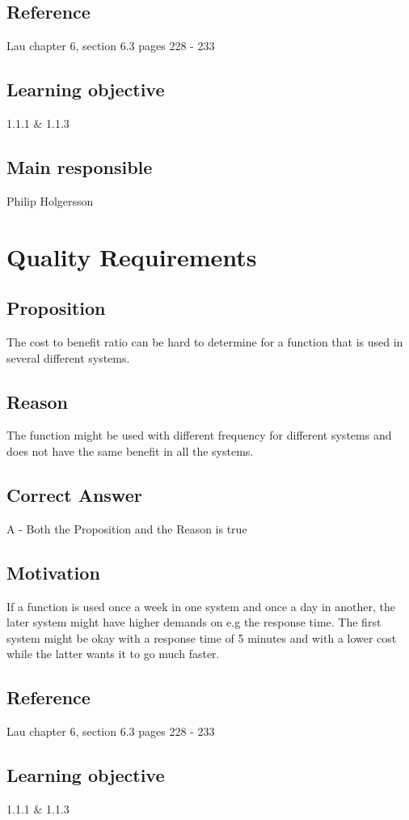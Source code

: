 \documentclass[a4paper]{article}
\begin{document}
\subsection*{Reference}
Lau chapter 6, section 6.3 pages 228 - 233
\subsection*{Learning objective}
1.1.1 \& 1.1.3
\subsection*{Main responsible}
Philip Holgersson



\section{Quality Requirements}
\subsection*{Proposition}
The cost to benefit ratio can be hard to determine for a function that is used in several different systems.
\subsection*{Reason}
The function might be used with different frequency for different systems and does not have the same benefit in all the systems.
\subsection*{Correct Answer}
A - Both the Proposition and the Reason is true
\subsection*{Motivation}
If a function is used once a week in one system and once a day in another, the later system might have higher demands on e.g the response time. The first system might be okay with a response time of 5 minutes and with a lower cost while the latter wants it to go much faster. 
\subsection*{Reference}
Lau chapter 6, section 6.3 pages 228 - 233
\subsection*{Learning objective}
1.1.1 \& 1.1.3
\end{document}
